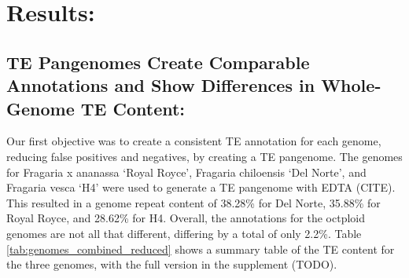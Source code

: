 \documentclass[fleqn,10pt]{olplainarticle}
\begin{document}


\section{Results:}
\subsection{TE Pangenomes Create Comparable Annotations and Show Differences in Whole-Genome TE Content:}
Our first objective was to create a consistent TE annotation for each genome, reducing false positives and negatives, by creating a TE pangenome.
The genomes for Fragaria x ananassa `Royal Royce', Fragaria chiloensis `Del Norte', and Fragaria vesca `H4' were used to generate a TE pangenome with EDTA (CITE).
This resulted in a genome repeat content of 38.28\% for Del Norte, 35.88\% for Royal Royce, and 28.62\% for H4.
Overall, the annotations for the octploid genomes are not all that different, differing by a total of only 2.2\%.
Table \ref{tab:genomes_combined_reduced} shows a summary table of the TE content for the three genomes, with the full version in the supplement (TODO).
\end{document}
